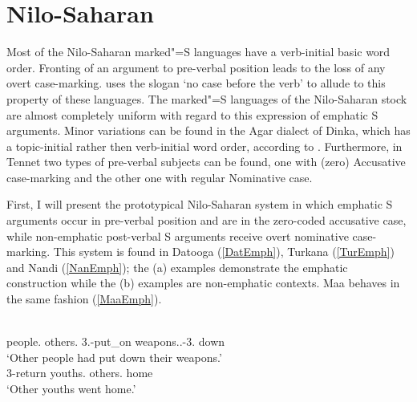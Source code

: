 
\section{Nilo-Saharan}\label{EmphNilo}

Most of the Nilo-Saharan marked"=S languages have a verb-initial basic word order. 
Fronting of an argument to pre-verbal position leads to the loss of any overt case-marking. \citet{Koenig:2008} uses the slogan `no case before the verb' to allude to this property of these languages.  
The marked"=S languages of the Nilo-Saharan stock are almost completely uniform with regard to this expression of emphatic S arguments. 
Minor variations can be found in the Agar dialect of Dinka, which has a topic-initial rather then verb-initial word order, according to \citet{Andersen:1991}. 
Furthermore, in Tennet two types of pre-verbal subjects can be found, one with (zero) Accusative case-marking and the other one with regular Nominative case.

First, I will present the prototypical Nilo-Saharan system in which emphatic S arguments occur in pre-verbal position and are in the zero-coded accusative case, while non-emphatic post-verbal S arguments receive overt nominative case-marking. 
This system is found in Datooga (\ref{DatEmph}), Turkana (\ref{TurEmph}) and Nandi (\ref{NanEmph}); the (a) examples demonstrate the emphatic construction while the (b) examples are non-emphatic contexts. Maa behaves in the same fashion (\ref{MaaEmph}).

\begin{exe}\ex\label{DatEmph}
\begin{xlist} 
\ex\gll {}     \\
people.\acc{} others.\acc{} \topic{} \sbj{}3.\prf{}-put\_on weapons.\acc{}.\cs{}-3\pl{}.\poss{} down\\
\glt `Other people had put down their weapons.'
\ex\gll {}   \\
\sbj{}3-return youths.\nom{} others.\nom{} home\\
\glt `Other youths went home.'
\end{xlist}
\end{exe}

